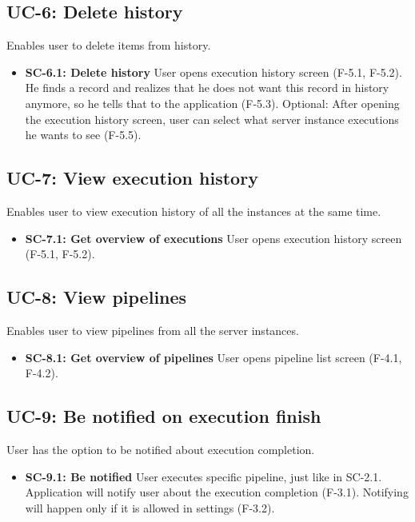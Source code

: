 \subsection*{UC-6: Delete history}
Enables user to delete items from history.

\begin{itemize}
\item \textbf{SC-6.1: Delete history}
User opens execution history screen (F-5.1, F-5.2). He finds a record and realizes that he does not want this record in history anymore, so he tells that to the application (F-5.3). Optional: After opening the execution history screen, user can select what server instance executions he wants to see (F-5.5).

\end{itemize}

\subsection*{UC-7: View execution history}
Enables user to view execution history of all the instances at the same time.

\begin{itemize}
\item \textbf{SC-7.1: Get overview of executions}
User opens execution history screen (F-5.1, F-5.2).

\end{itemize}

\subsection*{UC-8: View pipelines}
Enables user to view pipelines from all the server instances.

\begin{itemize}
\item \textbf{SC-8.1: Get overview of pipelines}
User opens pipeline list screen (F-4.1, F-4.2).

\end{itemize}

\subsection*{UC-9: Be notified on execution finish}
User has the option to be notified about execution completion.

\begin{itemize}
\item \textbf{SC-9.1: Be notified}
User executes specific pipeline, just like in SC-2.1. Application will notify user about the execution completion (F-3.1). Notifying will happen only if it is allowed in settings (F-3.2).

\end{itemize}

